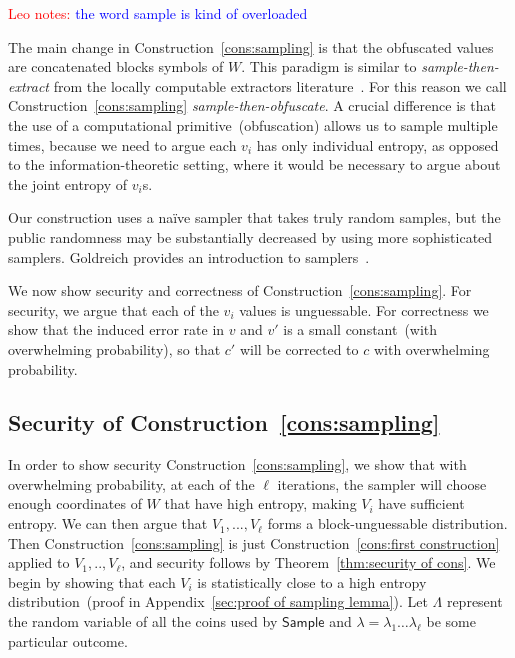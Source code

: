 \documentclass[11pt]{article}
\newcommand{\apref}[1]{\mbox{Appendix~\ref{#1}}}
\newcommand{\thref}[1]{\mbox{Theorem~\ref{#1}}}
\newcommand{\consref}[1]{\mbox{Construction~\ref{#1}}}
\newcommand{\class}[1]{{\ensuremath{\mathsf{#1}}}}
\newcommand{\sample}{\ensuremath{\class{Sample}}\xspace}
\newcommand{\authnote}[2]{{\textcolor{red}{\textsf{#1 notes: }\textcolor{blue}{ #2}}\marginpar{\textcolor{red}{\textbf{!!!!!}}}}}
\newcommand{\authnote}[2]{}
\newcommand{\lnote}[1]{{\authnote{Leo}{#1}}}
\begin{document}
\lnote{the word sample is kind of overloaded}

The main change in \consref{cons:sampling} is that the obfuscated values are concatenated blocks symbols of $W$.  This paradigm is similar to \emph{sample-then-extract} from the locally computable extractors literature~\cite{lu2002hyper,vadhan2003constructing}.  For this reason we call \consref{cons:sampling} \emph{sample-then-obfuscate}.  A crucial difference is that the use of a computational primitive~(obfuscation) allows us to sample multiple times, because we need to argue each $v_i$ has only individual entropy, as opposed to the information-theoretic setting, where it would be necessary to argue about the joint entropy of $v_i$s. 

Our construction uses a na\"{i}ve sampler that takes truly random samples, but the public randomness may be substantially decreased by using more sophisticated samplers. Goldreich provides an introduction to samplers~\cite{goldreich1997sample}.

We now show security and correctness of \consref{cons:sampling}.  For security, we argue that each of the $v_i$ values is unguessable.  For correctness we show that the induced error rate in $v$ and $v'$ is a small constant~(with overwhelming probability), so that $c'$ will be corrected to $c$ with overwhelming probability.

\subsection{Security of \consref{cons:sampling}}
In order to show security \consref{cons:sampling}, we 
show that with overwhelming probability, at each of the $\ell$ iterations, the sampler will choose enough coordinates of $W$ that have high entropy, making $V_i$ have sufficient entropy.   We can then argue that $V_1,..., V_\ell$ forms a block-unguessable distribution.  Then \consref{cons:sampling} is just \consref{cons:first construction} applied to $V_1,.., V_\ell$, and security follows by \thref{thm:security of cons}.  We begin by showing that each $V_i$ is statistically close to a high entropy distribution~(proof in \apref{sec:proof of sampling lemma}).   Let $\Lambda$ represent the random variable of all the coins used by $\sample$ and $\lambda=\lambda_1 \dots \lambda_\ell$
be some particular outcome.
\end{document}
